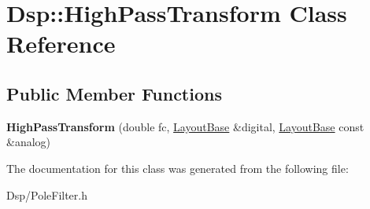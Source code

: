 \hypertarget{classDsp_1_1HighPassTransform}{\section{Dsp\-:\-:High\-Pass\-Transform Class Reference}
\label{classDsp_1_1HighPassTransform}
}
\subsection*{Public Member Functions}
\begin{DoxyCompactItemize}
\item 
\hypertarget{classDsp_1_1HighPassTransform_a1f4fba282c754bb0a880c2dc182fa33b}{{\bfseries High\-Pass\-Transform} (double fc, \hyperlink{classDsp_1_1LayoutBase}{Layout\-Base} \&digital, \hyperlink{classDsp_1_1LayoutBase}{Layout\-Base} const \&analog)}\label{classDsp_1_1HighPassTransform_a1f4fba282c754bb0a880c2dc182fa33b}

\end{DoxyCompactItemize}


The documentation for this class was generated from the following file\-:\begin{DoxyCompactItemize}
\item 
Dsp/Pole\-Filter.\-h\end{DoxyCompactItemize}
